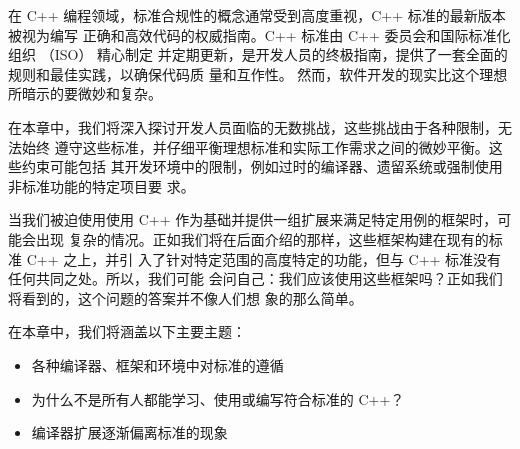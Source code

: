 在 C++ 编程领域，标准合规性的概念通常受到高度重视，C++ 标准的最新版本被视为编写
正确和高效代码的权威指南。C++ 标准由 C++ 委员会和国际标准化组织 （ISO） 精心制定
并定期更新，是开发人员的终极指南，提供了一套全面的规则和最佳实践，以确保代码质
量和互作性。 然而，软件开发的现实比这个理想所暗示的要微妙和复杂。

在本章中，我们将深入探讨开发人员面临的无数挑战，这些挑战由于各种限制，无法始终
遵守这些标准，并仔细平衡理想标准和实际工作需求之间的微妙平衡。这些约束可能包括
其开发环境中的限制，例如过时的编译器、遗留系统或强制使用非标准功能的特定项目要
求。

当我们被迫使用使用 C++ 作为基础并提供一组扩展来满足特定用例的框架时，可能会出现
复杂的情况。正如我们将在后面介绍的那样，这些框架构建在现有的标准 C++ 之上，并引
入了针对特定范围的高度特定的功能，但与 C++ 标准没有任何共同之处。所以，我们可能
会问自己：我们应该使用这些框架吗？正如我们将看到的，这个问题的答案并不像人们想
象的那么简单。

在本章中，我们将涵盖以下主要主题：

\begin{itemize}
\item 
各种编译器、框架和环境中对标准的遵循

\item 
为什么不是所有人都能学习、使用或编写符合标准的 C++？

\item 
编译器扩展逐渐偏离标准的现象
\end{itemize}